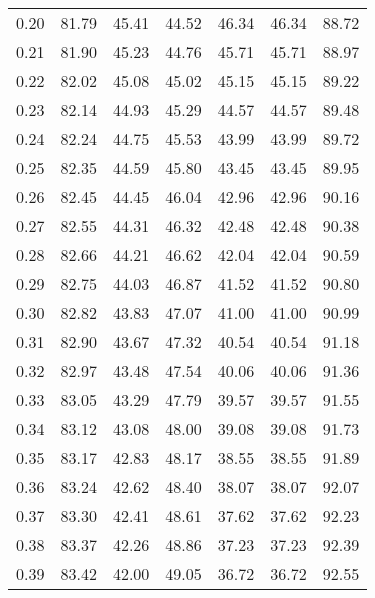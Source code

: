 \begin{tabular}{|c|c|c|c|c|c|c|}
      0.20 &     81.79 &     45.41 &      44.52 &   46.34 &      46.34 &         88.72 \\
      0.21 &     81.90 &     45.23 &      44.76 &   45.71 &      45.71 &         88.97 \\
      0.22 &     82.02 &     45.08 &      45.02 &   45.15 &      45.15 &         89.22 \\
      0.23 &     82.14 &     44.93 &      45.29 &   44.57 &      44.57 &         89.48 \\
      0.24 &     82.24 &     44.75 &      45.53 &   43.99 &      43.99 &         89.72 \\
      0.25 &     82.35 &     44.59 &      45.80 &   43.45 &      43.45 &         89.95 \\
      0.26 &     82.45 &     44.45 &      46.04 &   42.96 &      42.96 &         90.16 \\
      0.27 &     82.55 &     44.31 &      46.32 &   42.48 &      42.48 &         90.38 \\
      0.28 &     82.66 &     44.21 &      46.62 &   42.04 &      42.04 &         90.59 \\
      0.29 &     82.75 &     44.03 &      46.87 &   41.52 &      41.52 &         90.80 \\
      0.30 &     82.82 &     43.83 &      47.07 &   41.00 &      41.00 &         90.99 \\
      0.31 &     82.90 &     43.67 &      47.32 &   40.54 &      40.54 &         91.18 \\
      0.32 &     82.97 &     43.48 &      47.54 &   40.06 &      40.06 &         91.36 \\
      0.33 &     83.05 &     43.29 &      47.79 &   39.57 &      39.57 &         91.55 \\
      0.34 &     83.12 &     43.08 &      48.00 &   39.08 &      39.08 &         91.73 \\
      0.35 &     83.17 &     42.83 &      48.17 &   38.55 &      38.55 &         91.89 \\
      0.36 &     83.24 &     42.62 &      48.40 &   38.07 &      38.07 &         92.07 \\
      0.37 &     83.30 &     42.41 &      48.61 &   37.62 &      37.62 &         92.23 \\
      0.38 &     83.37 &     42.26 &      48.86 &   37.23 &      37.23 &         92.39 \\
      0.39 &     83.42 &     42.00 &      49.05 &   36.72 &      36.72 &         92.55 \\

\end{tabular}
